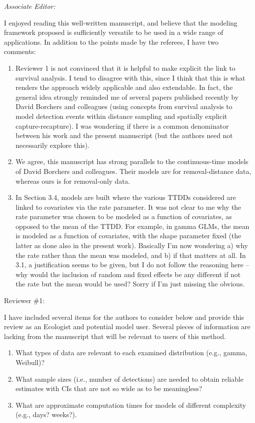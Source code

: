 \documentclass[12pt]{article}
\renewenvironment{quote}  %
              {\list{}{\rightmargin\leftmargin}\normalfont%
               \item\relax}
              {\endlist}
\begin{document}
\itshape
Associate Editor:

I enjoyed reading this well-written manuscript, and believe that the modeling framework proposed is sufficiently versatile to be used in a wide range of applications. In addition to the points made by the referees, I have two comments:
\begin{enumerate}
\item Reviewer 1 is not convinced that it is helpful to make explicit the link to survival analysis. I tend to disagree with this, since I think that this is what renders the approach widely applicable and also extendable. In fact, the general idea strongly reminded me of several papers published recently by David Borchers and colleagues (using concepts from survival analysis to model detection events within distance sampling and spatially explicit capture-recapture). I was wondering if there is a common denominator between his work and the present manuscript (but the authors need not necessarily explore this).
\begin{quote}
We agree, this manuscript has strong parallels to the continuous-time models of David Borchers and colleagues.  
Their models are for removal-distance data, whereas ours is for removal-only data.
\end{quote}
\item In Section 3.4, models are built where the various TTDDs considered are linked to covariates via the rate parameter. It was not clear to me why the rate parameter was chosen to be modeled as a function of covariates, as opposed to the mean of the TTDD. For example, in gamma GLMs, the mean is modeled as a function of covariates, with the shape parameter fixed (the latter as done also in the present work). Basically I'm now wondering a) why the rate rather than the mean was modeled, and b) if that matters at all. In 3.1, a justification seems to be given, but I do not follow the reasoning here – why would the inclusion of random and fixed effects be any different if not the rate but the mean would be used? Sorry if I'm just missing the obvious.
\end{enumerate}

\newpage



Reviewer \#1:

I have included several items for the authors to consider below and provide this review as an Ecologist and potential model user.
Several pieces of information are lacking from the manuscript that will be relevant to users of this method.
\begin{enumerate}
\item What types of data are relevant to each examined distribution (e.g., gamma, Weibull)?
\item What sample sizes (i.e., number of detections) are needed to obtain reliable estimates with CIs that are not so wide as to be meaningless?
\item What are approximate computation times for models of different complexity (e.g., days? weeks?).
\end{enumerate}
\end{document}
